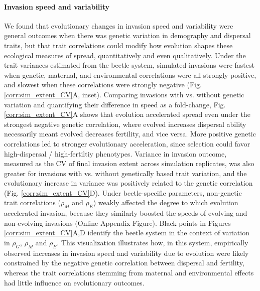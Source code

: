 \documentclass[11pt]{article}
\newcommand{\revise}[1]{{\color{Mahogany}{#1}}}
\begin{document}
\paragraph{Invasion speed and variability}
We found that evolutionary changes in invasion speed and variability were general outcomes when there was genetic variation in demography and dispersal traits, but that trait correlations could modify how evolution shapes these ecological measures of spread, quantitatively and even qualitatively.
Under the trait variances estimated from the beetle system, simulated invasions were fastest when genetic, maternal, and environmental correlations were all strongly positive, and slowest when these correlations were strongly negative (Fig. \ref{corr:sim_extent_CV}A, inset).
Comparing invasions with vs. without genetic variation and quantifying their difference in speed as a fold-change, Fig. \ref{corr:sim_extent_CV}A shows that evolution accelerated spread even under the strongest negative genetic correlation, where evolved increases \revise{in} dispersal ability necessarily meant evolved decreases \revise{in} fertility, and vice versa.
More positive genetic correlations led to stronger evolutionary acceleration, since selection could favor high-dispersal / high-fertiltiy phenotypes.
Variance in invasion outcome, measured as the CV of final invasion extent across simulation replicates, was also greater for invasions with vs. without genetically based trait variation, and the evolutionary increase in variance was positively related to the genetic correlation (Fig. \ref{corr:sim_extent_CV}D).
Under beetle-specific parameters, non-genetic trait correlations ($\rho_{M}$ and $\rho_{E}$) weakly affected the degree to which evolution accelerated invasion, because they similarly boosted the speeds of evolving and non-evolving invasions (Online Appendix Figure). 
Black points in Figures \ref{corr:sim_extent_CV}A,D identify the beetle system in the context of variation in $\rho_{G}$, $\rho_{M}$ and $\rho_{E}$.
This visualization illustrates how, in this system, empirically observed increases in invasion speed and variability due to evolution were likely constrained by the negative genetic correlation between dispersal and fertility, whereas the trait correlations stemming from maternal and environmental effects had little influence on evolutionary outcomes.
\end{document}

